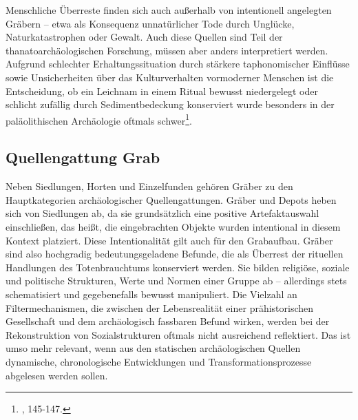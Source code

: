 \documentclass[openany,twoside,twocolumn]{book}
\let\rmarkdownfootnote\footnote%
\def\footnote{\protect\rmarkdownfootnote}
\begin{document}
Menschliche Überreste finden sich auch außerhalb von intentionell
angelegten Gräbern -- etwa als Konsequenz unnatürlicher Tode durch
Unglücke, Naturkatastrophen oder Gewalt. Auch diese Quellen sind Teil
der thanatoarchäologischen Forschung, müssen aber anders interpretiert
werden. Aufgrund schlechter Erhaltungssituation durch stärkere
taphonomischer Einflüsse sowie Unsicherheiten über das Kulturverhalten
vormoderner Menschen ist die Entscheidung, ob ein Leichnam in einem
Ritual bewusst niedergelegt oder schlicht zufällig durch
Sedimentbedeckung konserviert wurde besonders in der paläolithischen
Archäologie oftmals schwer\footnote{\textcite{hofmann_rituelle_2008},
  145-147.}.

\hypertarget{quellengattung-grab}{%
\subsection{Quellengattung Grab}\label{quellengattung-grab}}

Neben Siedlungen, Horten und Einzelfunden gehören Gräber zu den
Hauptkategorien archäologischer Quellengattungen. Gräber und Depots
heben sich von Siedlungen ab, da sie grundsätzlich eine positive
Artefaktauswahl einschließen, das heißt, die eingebrachten Objekte
wurden intentional in diesem Kontext platziert. Diese Intentionalität
gilt auch für den Grabaufbau. Gräber sind also hochgradig
bedeutungsgeladene Befunde, die als Überrest der rituellen Handlungen
des Totenbrauchtums konserviert werden. Sie bilden religiöse, soziale
und politische Strukturen, Werte und Normen einer Gruppe ab --
allerdings stets schematisiert und gegebenefalls bewusst manipuliert.
Die Vielzahl an Filtermechanismen, die zwischen der Lebensrealität einer
prähistorischen Gesellschaft und dem archäologisch fassbaren Befund
wirken, werden bei der Rekonstruktion von Sozialstrukturen oftmals nicht
ausreichend reflektiert. Das ist umso mehr relevant, wenn aus den
statischen archäologischen Quellen dynamische, chronologische
Entwicklungen und Transformationsprozesse abgelesen werden sollen.
\end{document}
